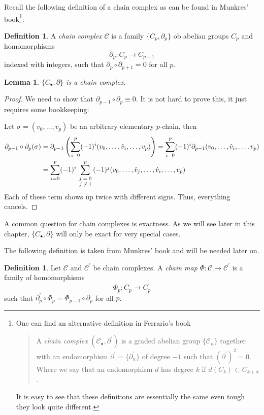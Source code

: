 \documentclass[toc=bib, headinclude]{scrartcl}
\theoremstyle{plain}
\newtheorem{lemma}[theorem]{Lemma}
\theoremstyle{definition}
\newtheorem	{definition}[theorem]{Definition}
\theoremstyle{remark}
\begin{document}
Recall the following definition of a chain complex as can be found in Munkres' book\footnote{One can find an alternative definition in Ferrario's book\parencite[p. 65]{fe}
	\begin{quotation}
		A \textit{chain complex} $(\mathcal{C}_\bullet,\partial^\prime)$ is a graded abelian group $\{\mathcal{C}_n\}$ together with an endomorphism $\partial^\prime=\{\partial^\prime_n\}$ of degree  $-1$ such that $(\partial^\prime)^2=0$. Where we say that an endomorphism $d$ has degree $k$ if $d(C_k)\subset C_{k+d}$.
\end{quotation}
It is easy to see that these definitions are essentially the same even tough they look quite different.
}\parencite[p. 71]{mu}:
\begin{definition}
	A \textit{chain complex} $\mathcal{C}$ is a family $\{C_p,\partial_p\}$ ob abelian groups $C_p$ and homomorphisms\[
	\partial_p: C_p\to C_{p-1}
	\]
	indexed with integers, such that $\partial_p\circ \partial_{p+1}=0$ for all $p$.
\end{definition}

 

\begin{lemma}
	$\{C_\bullet,\partial\}$ is a chain complex.
\end{lemma}

\begin{proof}
	We need to show that $\partial_{p-1}\circ\partial_p\equiv 0$. It is not hard to prove this, it just requires some bookkeeping:
	
	Let $\sigma=(v_0,\dots,v_p)$ be an arbitrary elementary $p$-chain, then
	\begin{align*}
		\partial_{p-1}\circ\partial_p(\sigma)&=\partial_{p-1}\left(\sum_{i=0}^{p}(-1)^i(v_0,\dots,\hat{v}_i,\dots,v_p)\right)=\sum_{i=0}^{p}(-1)^i\partial_{p-1}(v_0,\dots,\hat{v}_i,\dots,v_p)\\
		&=\sum_{i=0}^{p}(-1)^i\sum_{\parbox{.8cm}{\centering\scriptsize
				$j=0$\\$j\neq i$}}^{p}(-1)^j(v_0,\dots,\hat{v}_j,\dots,\hat{v}_i,\dots,v_p)
	\end{align*}
	Each of these term shows up twice with different signs. Thus, everything cancels.

\end{proof}

A common question for chain complexes is exactness. As we will see later in this chapter, $\{C_\bullet,\partial\}$ will only be exact for very special cases. 

The following definition is taken from Munkres' book \parencite[p. 72]{mu} and will be needed later on.
\begin{definition}
	Let $\mathcal{C}$ and $\mathcal{C}^\prime$ be chain complexes. A \textit{chain map} $\Phi:\mathcal{C}\to\mathcal{C}^\prime$ is a family of homomorphisms
	\[
	\Phi_p:C_p\to C_p^\prime
	\]
	such that $\partial_p^\prime\circ\Phi_p=\Phi_{p-1}\circ\partial_p$ for all $p$.
\end{definition}
\end{document}
